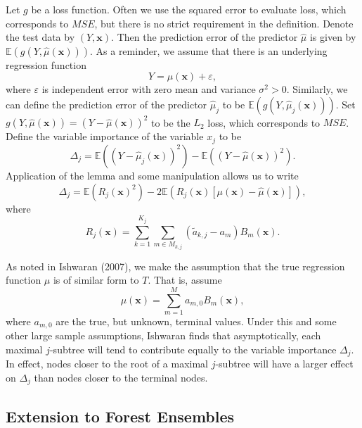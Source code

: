 \documentclass[12pt,twoside]{reedthesis}
\theoremstyle{definition}
\theoremstyle{definition}
\theoremstyle{definition}
\theoremstyle{remark}
\begin{document}
Let \(g\) be a loss function. Often we use the squared error to evaluate
loss, which corresponds to \(MSE\), but there is no strict requirement
in the definition. Denote the test data by \((Y,\mathbf{x})\). Then the
prediction error of the predictor \(\hat{\mu}\) is given by
\(\mathbb{E}(g(Y,\hat{\mu}(\mathbf{x})))\). As a reminder, we assume
that there is an underlying regression function
\[Y=\mu(\mathbf{x})+\varepsilon,\] where \(\varepsilon\) is independent
error with zero mean and variance \(\sigma^2>0\). Similarly, we can
define the prediction error of the predictor \(\hat{\mu}_j\) to be
\(\mathbb{E}(g(Y,\hat{\mu}_j(\mathbf{x}))).\) Set
\(g(Y,\hat{\mu}(\mathbf{x}))=(Y-\hat{\mu}(\mathbf{x}))^2\) to be the
\(L_2\) loss, which corresponds to \(MSE\). Define the variable
importance of the variable \(x_j\) to be
\[\Delta_j=\mathbb{E}((Y-\hat{\mu}_j(\mathbf{x}))^2)-\mathbb{E}((Y-\hat{\mu}(\mathbf{x}))^2).\]
Application of the lemma and some manipulation allows us to write
\[\Delta_j=\mathbb{E}(R_j(\mathbf{x})^2)-2\mathbb{E}\left(R_j(\mathbf{x})[\mu(\mathbf{x})-\hat{\mu}(\mathbf{x})]\right),\]
where
\[R_j(\mathbf{x})=\sum_{k=1}^{K_j}\sum_{m\in M_{k,j}} (\tilde{a}_{k,j} -a_m)B_m(\mathbf{x}).\]

As noted in Ishwaran (2007), we make the assumption that the true
regression function \(\mu\) is of similar form to \(T\). That is, assume
\[\mu(\mathbf{x})=\sum_{m=1}^M a_{m,0} B_m(\mathbf{x}),\] where
\(a_{m,0}\) are the true, but unknown, terminal values. Under this and
some other large sample assumptions, Ishwaran finds that asymptotically,
each maximal \(j\)-subtree will tend to contribute equally to the
variable importance \(\Delta_j\). In effect, nodes closer to the root of
a maximal \(j\)-subtree will have a larger effect on \(\Delta_j\) than
nodes closer to the terminal nodes.

\subsection{Extension to Forest
Ensembles}\label{extension-to-forest-ensembles}
\end{document}
